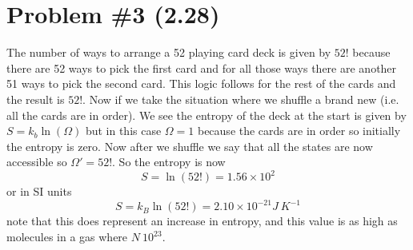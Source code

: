 \documentclass[11pt]{article}
\numberwithin{equation}{section}
\begin{document}
\section{Problem \#3 (2.28)}
The number of ways to arrange a 52 playing card deck is given by $52!$ because there are 52 ways to pick the first card and for all those ways there are another 51 ways to pick the second card. This logic follows for the rest of the cards and the result is $52!$. Now if we take the situation where we shuffle a brand new (i.e. all the cards are in order). We see the entropy of the deck at the start is given by $S = k_b\ln(\Omega)$ but in this case $\Omega = 1$ because the cards are in order so initially the entropy is zero. Now after we shuffle we say that all the states are now accessible so $\Omega' = 52!$. So the entropy is now
$$S = \ln(52!) = 1.56\times10^{2}$$
or in SI units 
$$S = k_B\ln(52!) = 2.10\times10^{-21}\unit{J\ K^{-1}}$$
note that this does represent an increase in entropy, and this value is as high as molecules in a gas where $N~10^{23}$.
\end{document}
